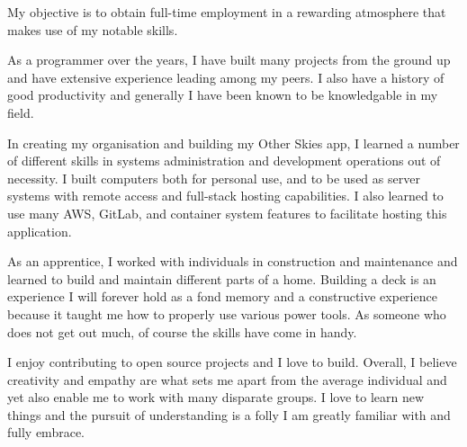 
\begin{cvparagraph}
   My objective is to obtain full-time employment in a rewarding atmosphere that makes use of my
   notable skills.

   As a programmer over the years, I have built many projects from the ground up and have extensive
   experience leading among my peers. I also have a history of good productivity and generally I have
   been known to be knowledgable in my field.

   In creating my organisation and building my Other Skies app, I learned a number of different skills
   in systems administration and development operations out of necessity. I built computers both for
   personal use, and to be used as server systems with remote access and full-stack hosting capabilities.
   I also learned to use many AWS, GitLab, and container system features to facilitate hosting this
   application.

   As an apprentice, I worked with individuals in construction and maintenance and learned to build
   and maintain different parts of a home. Building a deck is an experience I will forever hold as
   a fond memory and a constructive experience because it taught me how to properly use various power
   tools. As someone who does not get out much, of course the skills have come in handy.

   I enjoy contributing to open source projects and I love to build. Overall, I believe creativity
   and empathy are what sets me apart from the average individual and yet also enable me to work
   with many disparate groups. I love to learn new things and the pursuit of understanding is a folly
   I am greatly familiar with and fully embrace.
\end{cvparagraph}
